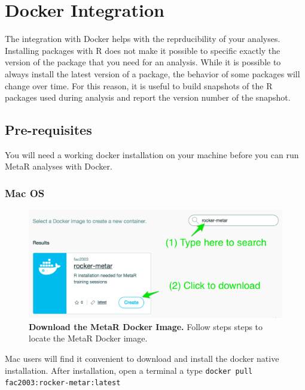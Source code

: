 

\chapter{Docker Integration}\label{chap:DockerIntegration}
The integration with Docker helps with the reprducibility of your analyses. Installing packages with R does not make it possible to specific exactly the version of the package that you need for an analysis. While it is possible to always install the latest version of a package, the behavior of some packages will change over time. For this reason, it is useful to build snapshots of the R packages used during analysis and report the version number of the snapshot. 

\section{Pre-requisites}
You will need a working docker installation on your machine before you can run MetaR analyses with Docker.
\subsection{Mac OS}
\begin{figure}
  \centering
  \includegraphics[width=\figWidthNarrow]{figures/Rocker-MetaR-Image.png}
\caption[Download the MetaR Docker Image.]{\textbf{Download the MetaR Docker Image.} Follow steps steps to locate the MetaR Docker image.}
\label{fig:RockerMetaRImage}
\end{figure}

Mac users will find it convenient to download and install the docker native installation. After installation, open a terminal a type 
\texttt{docker pull fac2003:rocker-metar:latest} 


